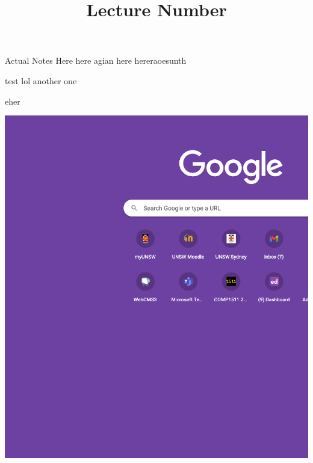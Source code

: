 \documentclass[20pt]{extarticle}
\title{Lecture Number}
\begin{document}
\maketitle

Actual Notes Here
here agian
here
hereraoesunth

\newpage
test
lol
\newpage
another one

eher

\newpage

\includegraphics{img/2023-09-28-22-06-03.png}
\end{document}
